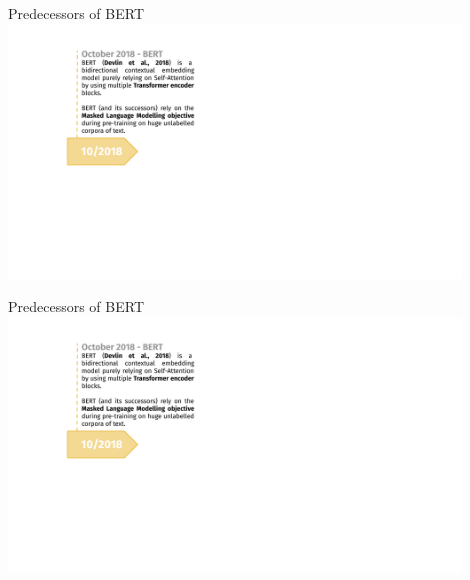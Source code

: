 \begin{vbframe}{Predecessors of BERT}
\hbox{\hspace{-3em} \includegraphics[width=12cm,page=4]{figure/transfer_learning_timeline2_nlp.pdf}}
\end{vbframe}
\begin{vbframe}{Predecessors of BERT}
\hbox{\hspace{-3em} \includegraphics[width=12cm,page=5]{figure/transfer_learning_timeline2_nlp.pdf}}
\end{vbframe}


\endlecture

